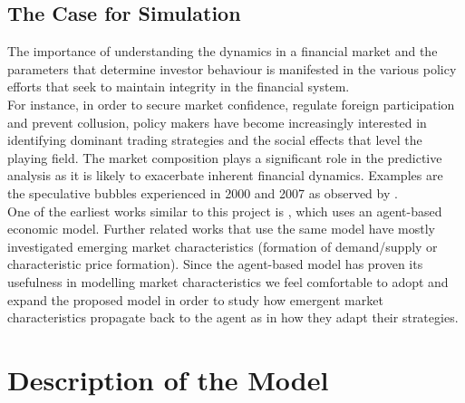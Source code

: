 \documentclass[11pt]{article}
\begin{document}
\subsection{The Case for Simulation}
The importance of understanding the dynamics in a financial market and the parameters that determine investor behaviour is manifested in the various policy efforts that seek to maintain integrity in the financial system.\\
For instance, in order to secure market confidence, regulate foreign participation and prevent collusion, policy makers have become increasingly interested in identifying dominant trading strategies and the social effects that level the playing field. The market composition plays a significant role in the predictive analysis as it is likely to exacerbate inherent financial dynamics. Examples are the speculative bubbles experienced in 2000 and 2007 as observed by \citet{kaizoji2015super}. \\
One of the earliest works similar to this project is \citet{de1990noise}, which uses an agent-based economic model. Further related works that use the same model have mostly investigated emerging market characteristics (formation of demand/supply or characteristic price formation). Since the agent-based model has proven its usefulness in modelling market characteristics we feel comfortable to adopt and expand the proposed model in order to study how emergent market characteristics propagate back to the agent as in how they adapt their strategies.

\section{Description of the Model}
\end{document}
